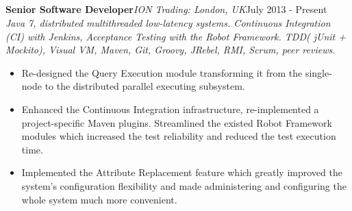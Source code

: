 \documentclass{res}
\newcommand{\jobdes}[4]{\needspace{3\baselineskip}%
{\noindent \bf #3\hspace{2ex}}{{\em \small #1}}{\hfill #2}\\{{\em \small #4.}}}
\newcommand{\osection}[1]{\section{\sc {\Large \textbf{#1}\\}} \vspace{0.30cm}}
\begin{document}
\begin{resume}
\osection{Career History}
\jobdes{ION Trading: London, UK} {July 2013 - Present}{Senior Software Developer}
{Java 7, distributed multithreaded low-latency systems. Continuous Integration (CI) with Jenkins, Acceptance Testing with the Robot Framework. TDD( jUnit + Mockito), Visual VM, Maven, Git, Groovy, JRebel, RMI, Scrum, peer reviews}
\begin{itemize}
 \item Re-designed the Query Execution module transforming it from the single-node to the distributed parallel executing subsystem.
 \item Enhanced the Continuous Integration infrastructure, re-implemented a project-specific Maven plugins. Streamlined the existed Robot Framework modules which increased the test reliability and reduced the test execution time.
 \item Implemented the Attribute Replacement feature which greatly improved the system’s configuration flexibility and made administering and configuring the whole system much more convenient.
 \end{itemize}


\end{resume}
\end{document}
